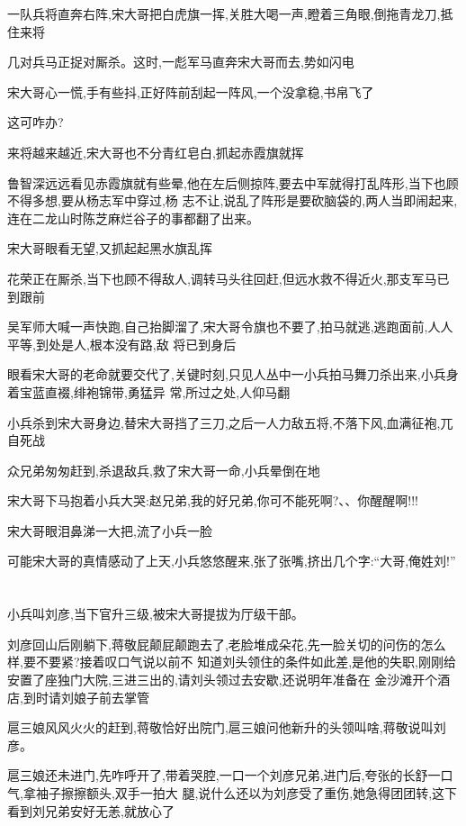 ﻿\documentclass[12pt]{article}
\begin{document}
一队兵将直奔右阵,宋大哥把白虎旗一挥,关胜大喝一声,瞪着三角眼,倒拖青龙刀,抵住来将

几对兵马正捉对厮杀。这时,一彪军马直奔宋大哥而去,势如闪电

宋大哥心一慌,手有些抖,正好阵前刮起一阵风,一个没拿稳,书帛飞了

这可咋办?

来将越来越近,宋大哥也不分青红皂白,抓起赤霞旗就挥

鲁智深远远看见赤霞旗就有些晕,他在左后侧掠阵,要去中军就得打乱阵形,当下也顾不得多想,要从杨志军中穿过,杨
志不让,说乱了阵形是要砍脑袋的,两人当即闹起来,连在二龙山时陈芝麻烂谷子的事都翻了出来。

宋大哥眼看无望,又抓起起黑水旗乱挥

花荣正在厮杀,当下也顾不得敌人,调转马头往回赶,但远水救不得近火,那支军马已到跟前

吴军师大喊一声快跑,自己抬脚溜了,宋大哥令旗也不要了,拍马就逃,逃跑面前,人人平等,到处是人,根本没有路,敌
将已到身后

眼看宋大哥的老命就要交代了,关键时刻,只见人丛中一小兵拍马舞刀杀出来,小兵身着宝蓝直裰,绯袍锦带,勇猛异
常,所过之处,人仰马翻

小兵杀到宋大哥身边,替宋大哥挡了三刀,之后一人力敌五将,不落下风,血满征袍,兀自死战

众兄弟匆匆赶到,杀退敌兵,救了宋大哥一命,小兵晕倒在地

宋大哥下马抱着小兵大哭:赵兄弟,我的好兄弟,你可不能死啊?、、你醒醒啊!!!

宋大哥眼泪鼻涕一大把,流了小兵一脸\dldots

可能宋大哥的真情感动了上天,小兵悠悠醒来,张了张嘴,挤出几个字:``大哥,俺姓刘!''
\section{}

小兵叫刘彦,当下官升三级,被宋大哥提拔为厅级干部。

刘彦回山后刚躺下,蒋敬屁颠屁颠跑去了,老脸堆成朵花,先一脸关切的问伤的怎么样,要不要紧?接着叹口气说以前不
知道刘头领住的条件如此差,是他的失职,刚刚给安置了座独门大院,三进三出的,请刘头领过去安歇,还说明年准备在
金沙滩开个酒店,到时请刘娘子前去掌管\dldots

扈三娘风风火火的赶到,蒋敬恰好出院门,扈三娘问他新升的头领叫啥,蒋敬说叫刘彦。

扈三娘还未进门,先咋呼开了,带着哭腔,一口一个刘彦兄弟,进门后,夸张的长舒一口气,拿袖子擦擦额头,双手一拍大
腿,说什么还以为刘彦受了重伤,她急得团团转,这下看到刘兄弟安好无恙,就放心了\dldots
\end{document}
